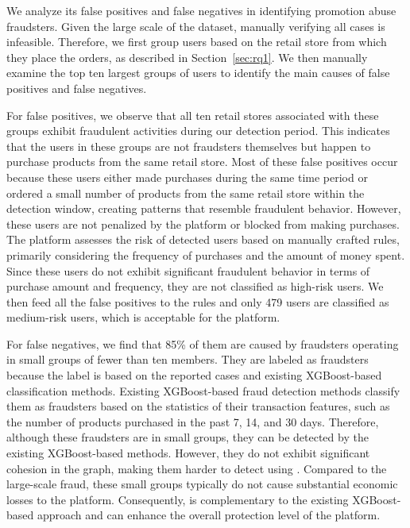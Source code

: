We analyze its false positives and false negatives in identifying promotion abuse fraudsters. Given the large scale of the dataset, manually verifying all cases is infeasible. Therefore, we first group users based on the retail store from which they place the orders, as described in Section~\ref{sec:rq1}. We then manually examine the top ten largest groups of users to identify the main causes of false positives and false negatives.

For false positives, we observe that all ten retail stores associated with these groups exhibit fraudulent activities during our detection period. This indicates that the users in these groups are not fraudsters themselves but happen to purchase products from the same retail store. Most of these false positives occur because these users either made purchases during the same time period or ordered a small number of products from the same retail store within the detection window, creating patterns that resemble fraudulent behavior. However, these users are not penalized by the platform or blocked from making purchases. The platform assesses the risk of detected users based on manually crafted rules, primarily considering the frequency of purchases and the amount of money spent. Since these users do not exhibit significant fraudulent behavior in terms of purchase amount and frequency, they are not classified as high-risk users. We then feed all the false positives to the rules and only 479 users are classified as medium-risk users, which is acceptable for the platform.


For false negatives, we find that 85\% of them are caused by fraudsters operating in small groups of fewer than ten members. They are labeled as fraudsters because the label is based on the reported cases and existing XGBoost-based classification methods. 
Existing XGBoost-based fraud detection methods classify them as fraudsters based on the statistics of their transaction features, such as the number of products purchased in the past 7, 14, and 30 days. Therefore, although these fraudsters are in small groups, they can be detected by the existing XGBoost-based methods. However, they do not exhibit significant cohesion in the graph, making them harder to detect using \toolname. 
Compared to the large-scale fraud, these small groups typically do not cause substantial economic losses to the platform. Consequently, \toolname is complementary to the existing XGBoost-based approach and can enhance the overall protection level of the platform.




